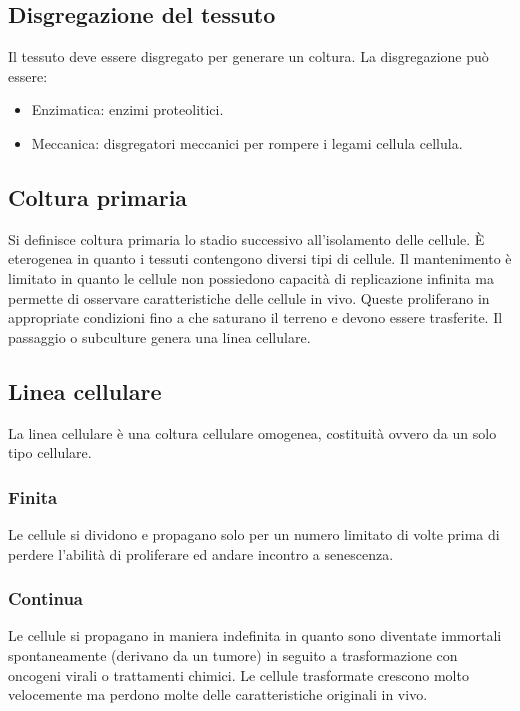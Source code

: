 	\subsection{Disgregazione del tessuto}
	Il tessuto deve essere disgregato per generare un coltura.
	La disgregazione pu\`o essere:
	\begin{itemize}
		\item Enzimatica: enzimi proteolitici.
		\item Meccanica: disgregatori meccanici per rompere i legami cellula cellula.
	\end{itemize}

	\subsection{Coltura primaria}
	Si definisce coltura primaria lo stadio successivo all'isolamento delle cellule.
	\`E eterogenea in quanto i tessuti contengono diversi tipi di cellule.
	Il mantenimento \`e limitato in quanto le cellule non possiedono capacit\`a di replicazione infinita ma permette di osservare caratteristiche delle cellule in vivo.
	Queste proliferano in appropriate condizioni fino a che saturano il terreno e devono essere trasferite. 
	Il passaggio o subculture genera una linea cellulare. 

	\subsection{Linea cellulare}
	La linea cellulare \`e una coltura cellulare omogenea, costituit\`a ovvero da un solo tipo cellulare.
			
		\subsubsection{Finita}
		Le cellule si dividono e propagano solo per un numero limitato di volte prima di perdere l'abilit\`a di proliferare ed andare incontro a senescenza.

		\subsubsection{Continua}
		Le cellule si propagano in maniera indefinita in quanto sono diventate immortali spontaneamente (derivano da un tumore) in seguito a trasformazione con oncogeni virali o trattamenti chimici.
		Le cellule trasformate crescono molto velocemente ma perdono molte delle caratteristiche originali in vivo. 

